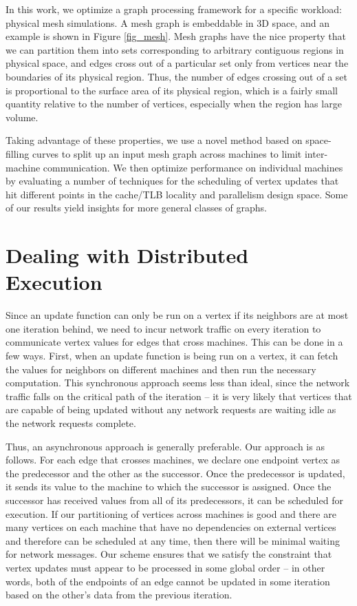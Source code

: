 \documentclass[journal]{IEEEtran}
\begin{document}
In this work, we optimize a graph processing framework for a specific workload: physical mesh simulations. A mesh graph is embeddable in 3D space, and an example is shown in Figure \ref{fig_mesh}. Mesh graphs have the nice property that we can partition them into sets corresponding to arbitrary contiguous regions in physical space, and edges cross out of a particular set only from vertices near the boundaries of its physical region. Thus, the number of edges crossing out of a set is proportional to the surface area of its physical region, which is a fairly small quantity relative to the number of vertices, especially when the region has large volume.

Taking advantage of these properties, we use a novel method based on space-filling curves to split up an input mesh graph across machines to limit inter-machine communication. We then optimize performance on individual machines by evaluating a number of techniques for the scheduling of vertex updates that hit different points in the cache/TLB locality and parallelism design space. Some of our results yield insights for more general classes of graphs.


\section{Dealing with Distributed Execution}
Since an update function can only be run on a vertex if its neighbors are at most one iteration behind, we need to incur network traffic on every iteration to communicate vertex values for edges that cross machines. This can be done in a few ways. First, when an update function is being run on a vertex, it can fetch the values for neighbors on different machines and then run the necessary computation. This synchronous approach seems less than ideal, since the network traffic falls on the critical path of the iteration -- it is very likely that vertices that are capable of being updated without any network requests are waiting idle as the network requests complete.

Thus, an asynchronous approach is generally preferable. Our approach is as follows. For each edge that crosses machines, we declare one endpoint vertex as the predecessor and the other as the successor. Once the predecessor is updated, it sends its value to the machine to which the successor is assigned. Once the successor has received values from all of its predecessors, it can be scheduled for execution. If our partitioning of vertices across machines is good and there are many vertices on each machine that have no dependencies on external vertices and therefore can be scheduled at any time, then there will be minimal waiting for network messages. Our scheme ensures that we satisfy the constraint that vertex updates must appear to be processed in some global order -- in other words, both of the endpoints of an edge cannot be updated in some iteration based on the other's data from the previous iteration.
\end{document}
